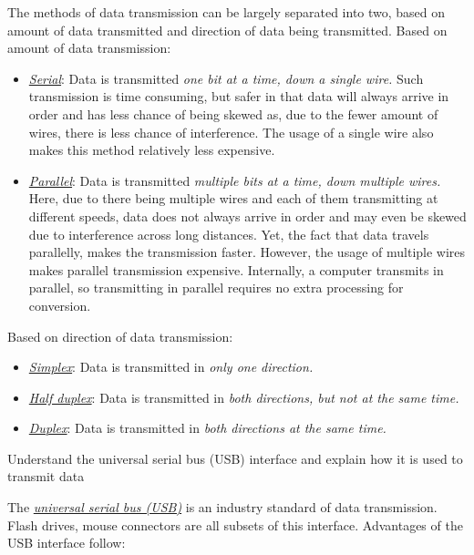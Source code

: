 The methods of data transmission can be largely separated
into two, based on amount of data transmitted and
direction of data being transmitted.
Based on amount of data transmission:
\begin{itemize}
	\item \ul{\emph{Serial}}: Data is transmitted \emph{one
		bit	at a time, down a single wire.} Such 
		transmission is time consuming, but safer in that
		data will always arrive in order and has less chance
		of being skewed as, due to the fewer amount of wires,
		there is less chance of interference. The usage of a
		single wire also makes this method relatively less
		expensive.
	\item \ul{\emph{Parallel}}: Data is transmitted \emph{
		multiple bits at a time, down multiple wires.} Here,
		due to there being multiple wires and each of them transmitting
		at different speeds, data does not always arrive in order and may
		even be skewed due to interference across long distances. Yet, 
		the fact that data travels parallelly, makes the transmission faster. However,
		the usage of multiple wires makes parallel transmission expensive.
		Internally, a computer transmits in parallel, so transmitting in parallel
		requires no extra processing for conversion.
\end{itemize}
Based on direction of data transmission:
\begin{itemize}
	\item \ul{\emph{Simplex}}: Data is transmitted in 
		\emph{only one direction.}
	\item \ul{\emph{Half duplex}}: Data is transmitted in
		\emph{both directions, but not at the same time.}
	\item \ul{\emph{Duplex}}: Data is transmitted in 
		\emph{both directions at the same time.}
\end{itemize}

\begin{point}
Understand the universal serial bus (USB)
interface and explain how it is used to transmit
data
\end{point}

The \emph{\ul{universal serial bus (USB)}} is an industry standard of data transmission.
Flash drives, mouse connectors are all subsets of this interface. Advantages of the USB
interface follow:


